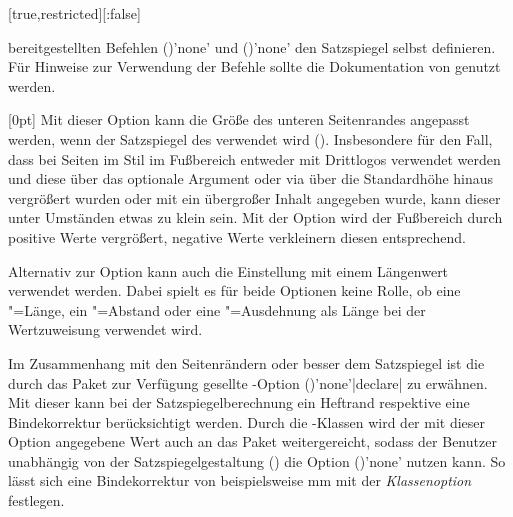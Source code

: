 \begin{Declaration*}{}
\begin{Declaration*}{}
\begin{Declaration*}{}
\begin{Declaration}[%
  v2.03;
  v2.05!\Option{cdgeometry=restricted};%
  v2.05!\Option{cdgeometry=adapted};%
  v2.05!\Option{cdgeometry=calculated};%
  v2.05!\Option{cdgeometry=custom};%
]{}[true,restricted][:false]
\begin{values}{}
  bereitgestellten Befehlen ()'none' und 
  ()'none' den Satzspiegel selbst 
  definieren. Für Hinweise zur Verwendung der Befehle sollte die Dokumentation 
  von  genutzt werden.
\end{values}
\end{Declaration}

\begin{Declaration}[v2.03]{}[0pt]%
\printdeclarationlist%
%
Mit dieser Option kann die Größe des unteren Seitenrandes angepasst werden, 
wenn der Satzspiegel des \CDs verwendet wird ().
Insbesondere für den Fall, dass bei Seiten im Stil  
im Fußbereich entweder mit  Drittlogos verwendet werden und 
diese über das optionale Argument oder via  über die 
Standardhöhe hinaus vergrößert wurden oder mit  ein 
übergroßer Inhalt angegeben wurde, kann dieser unter Umständen etwas zu klein 
sein. Mit der Option  wird der Fußbereich durch 
positive Werte vergrößert, negative Werte verkleinern diesen entsprechend. 

Alternativ zur Option  kann auch die Einstellung 
 mit einem Längenwert verwendet werden. 
Dabei spielt es für beide Optionen keine Rolle, ob eine "=Länge, 
ein "=Abstand oder eine "=Ausdehnung als Länge bei der 
Wertzuweisung verwendet wird.
\end{Declaration}

%
%
Im Zusammenhang mit den Seitenrändern oder besser dem Satzspiegel ist die durch 
das Paket  zur Verfügung gesellte \KOMAScript-Option 
()'none'|declare| zu 
erwähnen. Mit dieser kann bei der Satzspiegelberechnung ein Heftrand respektive 
eine Bindekorrektur berücksichtigt werden. Durch die \TUDScript-Klassen wird 
der mit dieser Option angegebene Wert auch an das Paket  
weitergereicht, sodass der Benutzer unabhängig von der Satzspiegelgestaltung 
() die Option ()'none' nutzen 
kann. So lässt sich eine Bindekorrektur von beispielsweise \unit[5]{mm} mit der 
\emph{Klassenoption}  festlegen.


\end{Declaration*}
\end{Declaration*}
\end{Declaration*}
